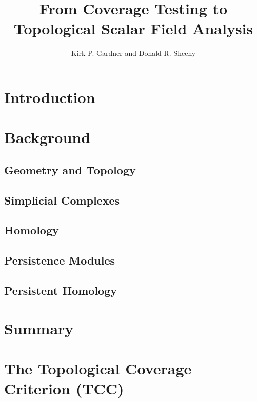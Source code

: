 \documentclass[12pt]{article}
\title{From Coverage Testing to Topological Scalar Field Analysis}
\author{Kirk P. Gardner and Donald R. Sheehy}
\begin{document}
\maketitle



\section{Introduction}\label{sec:introduction}




\section{Background}
  \subsection{Geometry and Topology}
  

  \subsection{Simplicial Complexes}\label{sec:complexes}
  

  \subsection{Homology}\label{sec:homology}
  

  \subsection{Persistence Modules}
  

  \subsection{Persistent Homology}
  


\section{Summary}\label{sec:summary}



\section{The Topological Coverage Criterion (TCC)}\label{sec:tcc}


\end{document}
